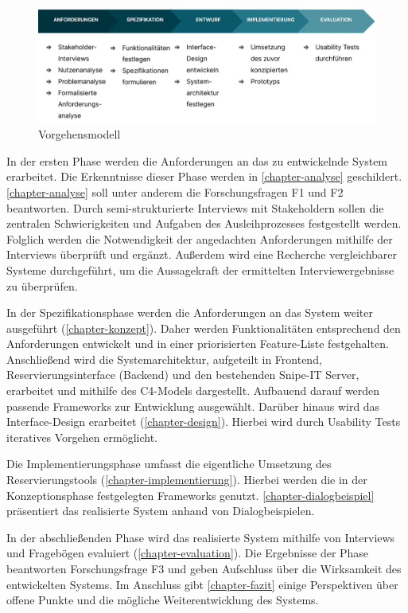 \begin{figure}[h]
  \centering
  \includegraphics[scale=0.34]{Bilder/vorgehen.png}
  \caption{Vorgehensmodell}
  \label{fig:vorgehen}
\end{figure}

In der ersten Phase werden die Anforderungen an das zu entwickelnde System
erarbeitet. Die Erkenntnisse dieser Phase werden in \ref{chapter-analyse}
geschildert. \ref{chapter-analyse} soll unter anderem die Forschungsfragen F1
und F2 beantworten. Durch semi-strukturierte Interviews mit Stakeholdern sollen
die zentralen Schwierigkeiten und Aufgaben des Ausleihprozesses festgestellt
werden. Folglich werden die Notwendigkeit der angedachten Anforderungen mithilfe
der Interviews überprüft und ergänzt. Außerdem wird eine Recherche
vergleichbarer Systeme durchgeführt, um die Aussagekraft der ermittelten
Interviewergebnisse zu überprüfen.

In der Spezifikationsphase werden die Anforderungen an das System weiter
ausgeführt (\ref{chapter-konzept}). Daher werden Funktionalitäten
entsprechend den Anforderungen entwickelt und in einer priorisierten
Feature-Liste festgehalten. Anschließend wird die Systemarchitektur, aufgeteilt
in Frontend, Reservierungsinterface (Backend) und den bestehenden Snipe-IT
Server, erarbeitet und mithilfe des C4-Models dargestellt. Aufbauend darauf
werden passende Frameworks zur Entwicklung ausgewählt. Darüber hinaus wird das
Interface-Design erarbeitet (\ref{chapter-design}). Hierbei wird durch Usability
Tests iteratives Vorgehen ermöglicht.


Die Implementierungsphase umfasst die eigentliche Umsetzung des
Reservierungstools (\ref{chapter-implementierung}). Hierbei werden die in der
Konzeptionsphase festgelegten Frameworks genutzt. \ref{chapter-dialogbeispiel}
präsentiert das realisierte System anhand von Dialogbeispielen.

In der abschließenden Phase wird das realisierte System mithilfe von Interviews
und Fragebögen evaluiert (\ref{chapter-evaluation}). Die Ergebnisse der Phase
beantworten Forschungsfrage F3 und geben Aufschluss über die Wirksamkeit des
entwickelten Systems. Im Anschluss gibt \ref{chapter-fazit} einige Perspektiven
über offene Punkte und die mögliche Weiterentwicklung des Systems.